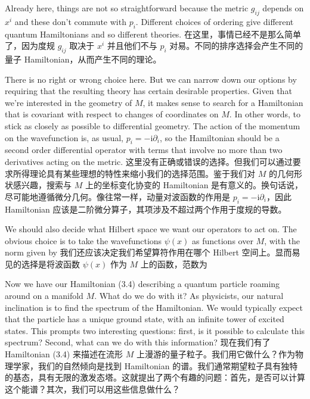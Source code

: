 \documentclass{article}
\newcommand{\rmi}{\mathrm{i}}
\begin{document}
\begin{paracol}{2}
Already here, things are not so straightforward because the metric $g_{ij}$ depends on $x^i$ and these don’t commute with $p_i$. Different choices of ordering give different quantum Hamiltonians and so different theories.
\switchcolumn
在这里，事情已经不是那么简单了，因为度规 $g_{ij}$ 取决于 $x^i$ 并且他们不与 $p_i$ 对易。不同的排序选择会产生不同的量子 Hamiltonian，从而产生不同的理论。
\switchcolumn*

There is no right or wrong choice here. But we can narrow down our options by requiring that the resulting theory has certain desirable properties. Given that we’re interested in the geometry of $M$, it makes sense to search for a Hamiltonian that is covariant with respect to changes of coordinates on $M$. In other words, to stick as closely as possible to differential geometry. The action of the momentum on the wavefunction is, as usual, $p_i = - \rmi \partial_i$, so the Hamiltonian should be a second order differential operator with terms that involve no more than two derivatives acting on the metric.
\switchcolumn
这里没有正确或错误的选择。但我们可以通过要求所得理论具有某些理想的特性来缩小我们的选择范围。鉴于我们对 $M$ 的几何形状感兴趣，搜索与 $M$ 上的坐标变化协变的 Hamiltonian 是有意义的。换句话说，尽可能地遵循微分几何。像往常一样，动量对波函数的作用是 $p_i = - \rmi \partial_i$，因此 Hamiltonian 应该是二阶微分算子，其项涉及不超过两个作用于度规的导数。
\switchcolumn*

We should also decide what Hilbert space we want our operators to act on. The obvious choice is to take the wavefunctions $\psi(x)$ as functions over $M$, with the norm given by
\switchcolumn
我们还应该决定我们希望算符作用在哪个 Hilbert 空间上。显而易见的选择是将波函数 $\psi(x)$ 作为 $M$ 上的函数，范数为
\switchcolumn*

Now we have our Hamiltonian (3.4) describing a quantum particle roaming around on a manifold $M$. What do we do with it? As physicists, our natural inclination is to find the spectrum of the Hamiltonian. We would typically expect that the particle has a unique ground state, with an infinite tower of excited states. This prompts two interesting questions: first, is it possible to calculate this spectrum? Second, what can we do with this information?
\switchcolumn
现在我们有了 Hamiltonian (3.4) 来描述在流形 $M$ 上漫游的量子粒子。我们用它做什么？作为物理学家，我们的自然倾向是找到 Hamiltonian 的谱。我们通常期望粒子具有独特的基态，具有无限的激发态塔。这就提出了两个有趣的问题：首先，是否可以计算这个能谱？其次，我们可以用这些信息做什么？
\switchcolumn*


\end{paracol}
\end{document}
